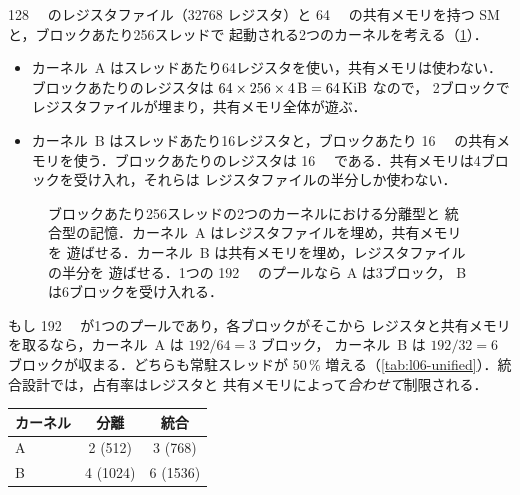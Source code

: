 \documentclass[../main.tex]{subfiles}
\begin{document}
\SI{128}{\kibi\byte} のレジスタファイル（\num{32768} レジスタ）と
\SI{64}{\kibi\byte} の共有メモリを持つ SM と，ブロックあたり256スレッドで
起動される2つのカーネルを考える（\cref{fig:l06-unified-pool}）．
\begin{itemize}
  \item カーネル~A はスレッドあたり64レジスタを使い，共有メモリは使わない．
    ブロックあたりのレジスタは
    $64 \times 256 \times \SI{4}{\byte} = \SI{64}{\kibi\byte}$ なので，
    2ブロックでレジスタファイルが埋まり，共有メモリ全体が遊ぶ．
  \item カーネル~B はスレッドあたり16レジスタと，ブロックあたり
    \SI{16}{\kibi\byte} の共有メモリを使う．ブロックあたりのレジスタは
    \SI{16}{\kibi\byte} である．共有メモリは4ブロックを受け入れ，それらは
    レジスタファイルの半分しか使わない．
\end{itemize}

\begin{figure}[tb]
  \centering
  
  \caption{ブロックあたり256スレッドの2つのカーネルにおける分離型と
    統合型の記憶．カーネル~A はレジスタファイルを埋め，共有メモリを
    遊ばせる．カーネル~B は共有メモリを埋め，レジスタファイルの半分を
    遊ばせる．1つの \SI{192}{\kibi\byte} のプールなら A は3ブロック，
    B は6ブロックを受け入れる．}
  \label{fig:l06-unified-pool}
\end{figure}

もし \SI{192}{\kibi\byte} が1つのプールであり，各ブロックがそこから
レジスタと共有メモリを取るなら，カーネル~A は $192/64 = 3$ ブロック，
カーネル~B は $192/32 = 6$ ブロックが収まる．どちらも常駐スレッドが
50\,\% 増える（\cref{tab:l06-unified}）．統合設計では，占有率はレジスタと
共有メモリによって\emph{合わせて}制限される．

\begin{margintable}
  \caption{\cref{fig:l06-unified-pool}のカーネルの SM あたり常駐
    ブロック数（スレッド数）．}
  \label{tab:l06-unified}
  \begin{tabular}{@{}lcc@{}}
    \toprule
    カーネル & 分離 & 統合 \\
    \midrule
    A & 2 (512) & 3 (768) \\
    B & 4 (1024) & 6 (1536) \\
    \bottomrule
  \end{tabular}
\end{margintable}
\end{document}
